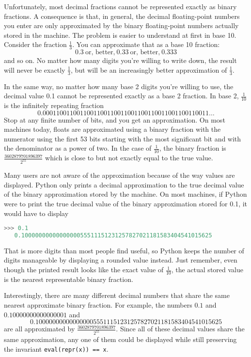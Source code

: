 Unfortunately, most decimal fractions cannot be represented exactly as binary fractions.
A consequence is that, in general, the decimal floating-point numbers you enter are only approximated by the binary floating-point numbers actually stored in the machine.
The problem is easier to understand at first in base 10.
Consider the fraction \(\frac{1}{3}\).
You can approximate that as a base 10 fraction:
\[0.3~\text{or, better,}~0.33~\text{or, better,}~0.333\]
and so on.
No matter how many digits you’re willing to write down, the result will never be exactly \(\frac{1}{3}\), but will be an increasingly better approximation of \(\frac{1}{3}\).

In the same way, no matter how many base 2 digits you’re willing to use, the decimal value 0.1 cannot be represented exactly as a base 2 fraction.
In base 2, \(\frac{1}{10}\) is the infinitely repeating fraction
\[0.0001100110011001100110011001100110011001100110011\ldots\]
Stop at any finite number of bits, and you get an approximation.
On most machines today, floats are approximated using a binary fraction with the numerator using the first 53 bits starting with the most significant bit and with the denominator as a power of two.
In the case of \(\frac{1}{10}\), the binary fraction is \(\frac{3602879701896397}{2^{55}}\) which is close to but not exactly equal to the true value.

Many users are not aware of the approximation because of the way values are displayed.
Python only prints a decimal approximation to the true decimal value of the binary approximation stored by the machine.
On most machines, if Python were to print the true decimal value of the binary approximation stored for 0.1, it would have to display
\begin{lstlisting}[language=Python]
   >>> 0.1
   0.1000000000000000055511151231257827021181583404541015625\end{lstlisting}
That is more digits than most people find useful, so Python keeps the number of digits manageable by displaying a rounded value instead.
Just remember, even though the printed result looks like the exact value of \(\frac{1}{10}\), the actual stored value is the nearest representable binary fraction.

Interestingly, there are many different decimal numbers that share the same nearest approximate binary fraction.
For example, the numbers \(0.1\) and \(0.10000000000000001\) and
\[0.1000000000000000055511151231257827021181583404541015625\]
are all approximated by \(\frac{3602879701896397}{2^{55}}\).
Since all of these decimal values share the same approximation, any one of them could be displayed while still preserving the invariant \lstinline|eval(repr(x)) == x|.

